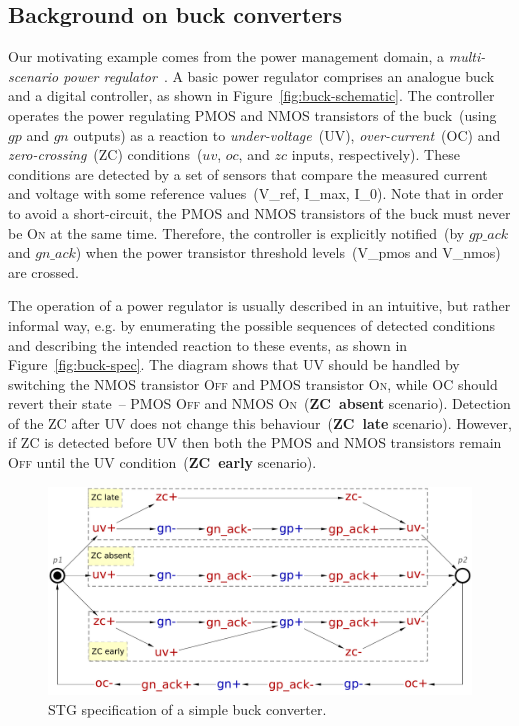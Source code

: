 \documentclass[british,compsoc]{IEEEtran}
\newcommand{\noun}[1]{\textsc{#1}}
\begin{document}
\subsection{Background on buck converters\label{sub:buck}}

Our motivating example comes from the power management domain, a
\emph{multi-scenario power regulator}~\cite{2014_sokolov_ftfc}.
A basic power regulator comprises an analogue buck and a digital controller,
as shown in Figure~\ref{fig:buck-schematic}. The controller operates
the power regulating PMOS and NMOS transistors of the buck~(using \textsf{$gp$}
and \textsf{$gn$} outputs) as a reaction to \emph{under-voltage}~(UV),
\emph{over-current}~(OC) and \emph{zero-crossing}~(ZC) conditions~(\textsf{$uv$},
\textsf{$oc$}, and \textsf{$zc$} inputs, respectively). These conditions
are detected by a set of sensors that compare the measured current and voltage
with some reference values~(\textsf{V\_ref}, \textsf{I\_max}, \textsf{I\_0}).
Note that in order to avoid a short-circuit, the PMOS and NMOS transistors of
the buck must never be \noun{On} at the same time. Therefore, the controller
is explicitly notified~(by \textsf{$gp\_ack$} and \textsf{$gn\_ack$})
when the power transistor threshold levels~(\textsf{V\_pmos} and \textsf{V\_nmos})
are crossed.

The operation of a power regulator is usually described in an intuitive,
but rather informal way, e.g. by enumerating the possible sequences
of detected conditions and describing the intended reaction to these
events, as shown in Figure~\ref{fig:buck-spec}. The diagram shows
that UV should be handled by switching the NMOS transistor \noun{Off}
and PMOS transistor \noun{On}, while OC should revert their state~--
PMOS \noun{Off} and NMOS \noun{On}~(\textbf{ZC~absent} scenario). Detection of
the ZC after UV does not change this behaviour~(\textbf{ZC~late} scenario).
However, if ZC is detected before UV then both the PMOS and NMOS transistors
remain \noun{Off} until the UV condition~(\textbf{ZC~early} scenario).

\begin{figure}[t]
\begin{centering}
\includegraphics[scale=0.23]{Images/stg-buck}
\par
\protect\caption{\label{fig:Monolithic-buck}STG specification of a simple buck converter.}
\par\end{centering}
\end{figure}
\end{document}
